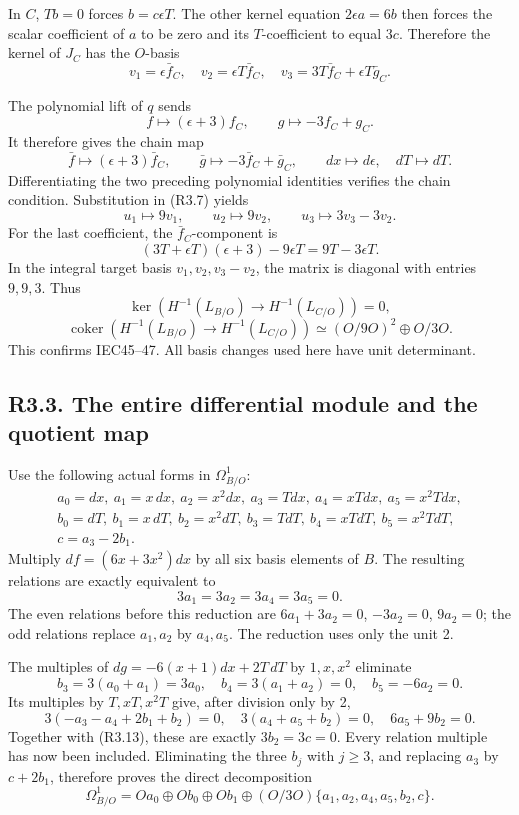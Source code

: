 \documentclass[
  10pt,
]{article}
\begin{document}
In \(C\), \(Tb=0\) forces \(b=c\epsilon T\). The other kernel equation
\(2\epsilon a=6b\) then forces the scalar coefficient of \(a\) to be
zero and its \(T\)-coefficient to equal \(3c\). Therefore the kernel of
\(J_C\) has the \(O\)-basis \[
v_1=\epsilon\bar f_C,\quad
v_2=\epsilon T\bar f_C,\quad
v_3=3T\bar f_C+\epsilon T\bar g_C.
\tag{R3.8}
\]

The polynomial lift of \(q\) sends \[
f\longmapsto(\epsilon+3)f_C,\qquad
g\longmapsto-3f_C+g_C.
\] It therefore gives the chain map \[
\bar f\longmapsto(\epsilon+3)\bar f_C,\qquad
\bar g\longmapsto-3\bar f_C+\bar g_C,\qquad
dx\longmapsto d\epsilon,\quad dT\longmapsto dT.
\tag{R3.9}
\] Differentiating the two preceding polynomial identities verifies the
chain condition. Substitution in (R3.7) yields \[
u_1\longmapsto9v_1,\qquad
u_2\longmapsto9v_2,\qquad
u_3\longmapsto3v_3-3v_2.
\tag{R3.10}
\] For the last coefficient, the \(\bar f_C\)-component is \[
(3T+\epsilon T)(\epsilon+3)-9\epsilon T
=9T-3\epsilon T.
\] In the integral target basis \(v_1,v_2,v_3-v_2\), the matrix is
diagonal with entries \(9,9,3\). Thus \[
\ker\!\left(H^{-1}(L_{B/O})\to H^{-1}(L_{C/O})\right)=0,
\] \[
\operatorname{coker}\!\left(H^{-1}(L_{B/O})\to H^{-1}(L_{C/O})\right)
\simeq(O/9O)^2\oplus O/3O.
\tag{R3.11}
\] This confirms IEC45--47. All basis changes used here have unit
determinant.

\subsection{R3.3. The entire differential module and the quotient
map}\label{r3.3.-the-entire-differential-module-and-the-quotient-map}

Use the following actual forms in \(\Omega^1_{B/O}\): \[
\begin{gathered}
a_0=dx,\ a_1=x\,dx,\ a_2=x^2dx,\ a_3=Tdx,\ 
a_4=xTdx,\ a_5=x^2Tdx,\\
b_0=dT,\ b_1=x\,dT,\ b_2=x^2dT,\ 
b_3=TdT,\ b_4=xTdT,\ b_5=x^2TdT,\\
c=a_3-2b_1.
\end{gathered}
\tag{R3.12}
\] Multiply \(df=(6x+3x^2)dx\) by all six basis elements of \(B\). The
resulting relations are exactly equivalent to \[
3a_1=3a_2=3a_4=3a_5=0.
\tag{R3.13}
\] The even relations before this reduction are \(6a_1+3a_2=0\),
\(-3a_2=0\), \(9a_2=0\); the odd relations replace \(a_1,a_2\) by
\(a_4,a_5\). The reduction uses only the unit 2.

The multiples of \(dg=-6(x+1)dx+2T\,dT\) by \(1,x,x^2\) eliminate \[
b_3=3(a_0+a_1)=3a_0,\quad
b_4=3(a_1+a_2)=0,\quad b_5=-6a_2=0.
\tag{R3.14}
\] Its multiples by \(T,xT,x^2T\) give, after division only by 2, \[
3(-a_3-a_4+2b_1+b_2)=0,\quad
3(a_4+a_5+b_2)=0,\quad
6a_5+9b_2=0.
\] Together with (R3.13), these are exactly \(3b_2=3c=0\). Every
relation multiple has now been included. Eliminating the three \(b_j\)
with \(j\ge3\), and replacing \(a_3\) by \(c+2b_1\), therefore proves
the direct decomposition \[
\Omega^1_{B/O}
=Oa_0\oplus Ob_0\oplus Ob_1
\oplus(O/3O)\{a_1,a_2,a_4,a_5,b_2,c\}.
\tag{R3.15}
\]
\end{document}
